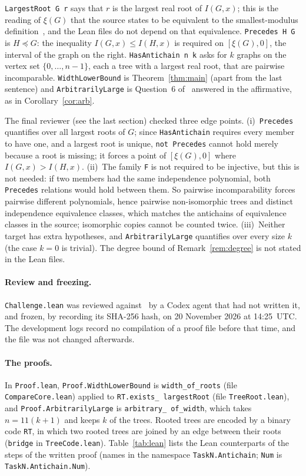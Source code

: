 \documentclass[11pt]{article}
\theoremstyle{definition}
\theoremstyle{remark}
\begin{document}
{\texttt{LargestRoot G r} says that $r$ is the largest real root of $I(G,x)$;
this is the reading of $\xi(G)$ that the source states to be equivalent to the
smallest-modulus definition~\cite[p.~30]{bc}, and the Lean files do not
depend on that equivalence. \texttt{Precedes H G} is $H\preceq G$: the
inequality $I(G,x)\le I(H,x)$ is required on $[\xi(G),0]$, the interval of the
graph on the right. \texttt{HasAntichain n k} asks for $k$ graphs on the
vertex set $\{0,\dots,n-1\}$, each a tree with a largest real root, that are
pairwise incomparable. \texttt{WidthLowerBound} is Theorem~\ref{thm:main}
(apart from the last sentence) and \texttt{ArbitrarilyLarge} is Question~6
of~\cite{bc} answered in the affirmative, as in Corollary~\ref{cor:arb}.

The final reviewer (see the last section) checked three edge points. (i)~\texttt{Precedes} quantifies over all largest roots of $G$; since
\texttt{HasAntichain} requires every member to have one, and a largest root is
unique, \texttt{not Precedes} cannot hold merely because a root is missing; it
forces a point of $[\xi(G),0]$ where $I(G,x)>I(H,x)$. (ii)~The family
\texttt{F} is not required to be injective, but this is not needed: if two
members had the same independence polynomial, both \texttt{Precedes}
relations would hold between them. So pairwise incomparability forces pairwise
different polynomials, hence pairwise non-isomorphic trees and distinct
independence equivalence classes, which matches the antichains of
equivalence classes in the source; isomorphic copies cannot be counted twice.
(iii)~Neither target has extra hypotheses, and \texttt{ArbitrarilyLarge}
quantifies over every size $k$ (the case $k=0$ is trivial). The degree bound
of Remark~\ref{rem:degree} is not stated in the Lean files.

\paragraph{Review and freezing.}
\texttt{Challenge.lean} was reviewed against~\cite{bc} by a Codex agent that had
not written it, and frozen, by recording its SHA-256 hash, on 20 November 2026
at 14:25~UTC. The development logs record no compilation of a proof file before
that time, and the file was not changed afterwards.

\paragraph{The proofs.}
In \texttt{Proof.lean}, \texttt{Proof.WidthLowerBound} is
\texttt{width\_\allowbreak of\_\allowbreak roots} (file
\texttt{CompareCore.lean}) applied to \texttt{RT.exists\_\allowbreak
largestRoot} (file \texttt{TreeRoot.lean}), and
\texttt{Proof.ArbitrarilyLarge} is \texttt{arbitrary\_\allowbreak
of\_\allowbreak width}, which takes $n=11(k+1)$ and keeps $k$ of the trees.
Rooted trees are encoded by a binary code \texttt{RT}, in which two rooted trees
are joined by an edge between their roots (\texttt{bridge} in
\texttt{TreeCode.lean}). Table~\ref{tab:lean} lists the Lean counterparts of
the steps of the written proof (names in the namespace
\texttt{TaskN.Antichain}; \texttt{Num} is \texttt{TaskN.Antichain.Num}).

}
\end{document}
